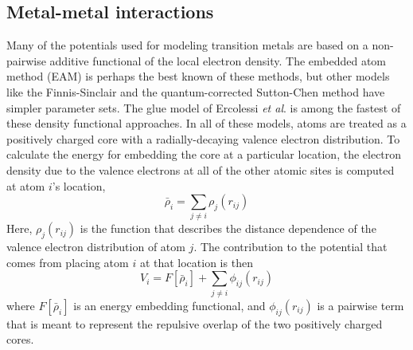 \subsection{Metal-metal interactions}
Many of the potentials used for modeling transition metals are based
on a non-pairwise additive functional of the local electron
density. The embedded atom method (EAM) is perhaps the best known of
these
methods,\citep{Daw:1984aq, Foiles:1986ky, Johnson:1989yr, Daw:1989ci, Plimpton:1993qi, Voter:1995ax, Lu:1997fv, Alemany:1998fp}
but other models like the Finnis-Sinclair\citep{Finnis:1984hl, Sutton:1990rr} and
the quantum-corrected Sutton-Chen method\citep{Goddard:1998qsc, Qi:1999dn} have simpler
parameter sets. The glue model of Ercolessi {\it et
  al}.\citep{Ercolessi:1988uo} is among the fastest of these density
functional approaches. In all of these models, atoms are treated as a
positively charged core with a radially-decaying valence electron
distribution. To calculate the energy for embedding the core at a
particular location, the electron density due to the valence electrons
at all of the other atomic sites is computed at atom $i$'s location,
\begin{equation*}
\bar{\rho}_i = \sum_{j\neq i} \rho_j(r_{ij})
\end{equation*}
Here, $\rho_j(r_{ij})$ is the function that describes the distance
dependence of the valence electron distribution of atom $j$. The
contribution to the potential that comes from placing atom $i$ at that
location is then
\begin{equation*}
V_i =  F[ \bar{\rho}_i ]  + \sum_{j \neq i} \phi_{ij}(r_{ij})
\end{equation*}
where $F[ \bar{\rho}_i ]$ is an energy embedding functional, and
$\phi_{ij}(r_{ij})$ is a pairwise term that is meant to represent the
repulsive overlap of the two positively charged cores.  


